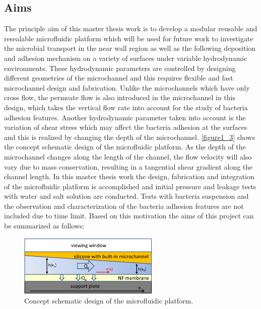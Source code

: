 \subsection{Aims}
\label{1_2_1}
The principle aim of this master thesis work is to develop a modular reusable and resealable microfluidic platform which will be used for future work to investigate the microbial transport in the near wall region as well as the following deposition and adhesion mechanism on a variety of surfaces under variable hydrodynamic environments. These hydrodynamic parameters are controlled by designing different geometries of the microchannel and this requires flexible and fast microchannel design and fabrication. Unlike the microchannels which have only cross flow, the permeate flow is also introduced in the microchannel in this design, which takes the vertical flow rate into account for the study of bacteria adhesion features. Another hydrodynamic parameter taken into account is the variation of shear stress which may affect the bacteria adhesion at the surfaces and this is realized by changing the depth of the microchannel. \autoref{figure1_3} shows the concept schematic design of the microfluidic platform. As the depth of the microchannel changes along the length of the channel, the flow velocity will also vary due to mass conservation, resulting in a tangential shear gradient along the channel length. In this master thesis work the design, fabrication and integration of the microfluidic platform is accomplished and initial pressure and leakage tests with water and salt solution are conducted. Tests with bacteria suspension and the observation and characterization of the bacteria adhesion features are not included due to time limit. Based on this motivation the aims of this project can be summarized as follows:

\begin{figure}[h]%
\centering
\includegraphics[width=0.6\textwidth]{figures/introduction/figure1_3}%
\caption{Concept schematic design of the microfluidic platform.}%
\label{figure1_3}%
\end{figure}

